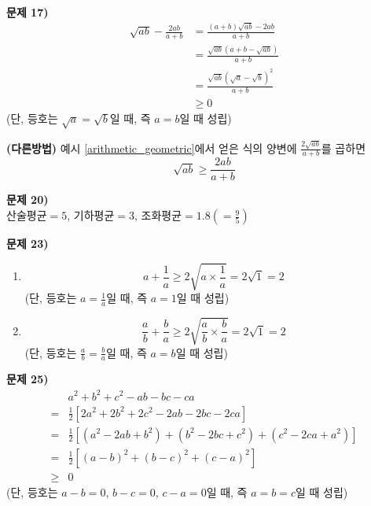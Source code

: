 \documentclass{oblivoir}
\newcounter{num}
\newcommand\an[1]{\par\bigskip\noindent\textbf{문제 #1)}\\}
\begin{document}
\clearpage
%
\an{17}
\begin{align*}
\sqrt{ab}-\frac{2ab}{a+b}
&=\frac{(a+b)\sqrt{ab}-2ab}{a+b}\\
&=\frac{\sqrt{ab}\left(a+b-\sqrt{ab}\right)}{a+b}\\
&=\frac{\sqrt{ab}(\sqrt a-\sqrt b)^2}{a+b}\\
&\ge0
\end{align*}
(단, 등호는 \(\sqrt a=\sqrt b\)일 때, 즉 \(a=b\)일 때 성립)

\vspace{40pt}
\textbf{(다른방법)}
예시 \ref{arithmetic_geometric}에서 얻은 식의 양변에 \(\frac{2\sqrt{ab}}{a+b}\)를 곱하면
\[\sqrt{ab}\ge\frac{2ab}{a+b}\]

%
\an{20}
\(산술평균=5\), \(기하평균=3\), \(조화평균=1.8\left(=\frac95\right)\)

%
\an{23}
\begin{enumerate}
\item
\[a+\frac1a\ge2\sqrt{a\times\frac1a}=2\sqrt1=2\]
(단, 등호는 \(a=\frac1a\)일 때, 즉 \(a=1\)일 때 성립)
\item
\[\frac ab+\frac ba\ge2\sqrt{\frac ab\times\frac ba}=2\sqrt1=2\]
(단, 등호는 \(\frac ab=\frac ba\)일 때, 즉 \(a=b\)일 때 성립)
\end{enumerate}

\clearpage
%
\an{25}
\begin{align*}
&a^2+b^2+c^2-ab-bc-ca\\
=&\frac12\left[2a^2+2b^2+2c^2-2ab-2bc-2ca\right]\\
=&\frac12\left[(a^2-2ab+b^2)+(b^2-2bc+c^2)+(c^2-2ca+a^2)\right]\\
=&\frac12\left[(a-b)^2+(b-c)^2+(c-a)^2\right]\\
\ge&0
\end{align*}
(단, 등호는 \(a-b=0\), \(b-c=0\), \(c-a=0\)일 때, 즉 \(a=b=c\)일 때 성립)
\end{document}
